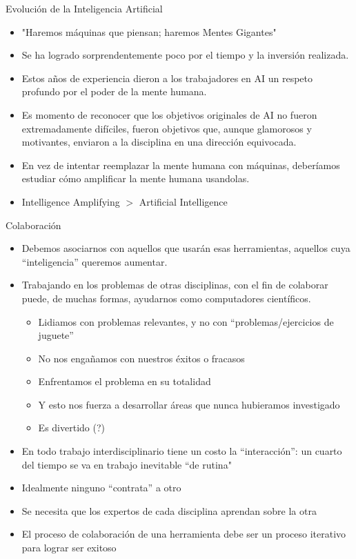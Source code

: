 \documentclass{beamer}
\begin{document}
\begin{frame}{Evolución de la Inteligencia Artificial}
\begin{itemize}
\item "Haremos máquinas que piensan; haremos Mentes Gigantes"
\item Se ha logrado sorprendentemente poco por el tiempo y la inversión realizada.
\item Estos años de experiencia dieron a los trabajadores en AI 
un respeto profundo por el poder de la mente humana.
\item Es momento de reconocer que los objetivos originales de AI 
no fueron extremadamente difíciles,
fueron objetivos que, aunque glamorosos y motivantes, 
enviaron a la disciplina en una dirección equivocada.
\item En vez de intentar reemplazar la mente humana con máquinas, 
deberíamos estudiar cómo amplificar la mente humana usandolas.
\item Intelligence Amplifying $>$ Artificial Intelligence
\end{itemize}
\end{frame}

\begin{frame}{Colaboración}
\begin{itemize}
\item Debemos asociarnos con aquellos que usarán esas herramientas, aquellos cuya ``inteligencia'' queremos aumentar.
\item Trabajando en los problemas de otras disciplinas, con el fin de colaborar puede, de muchas formas, ayudarnos como computadores científicos.
	\begin{itemize}
	\item Lidiamos con problemas relevantes, y no con ``problemas/ejercicios de juguete''
	\item No nos engañamos con nuestros éxitos o fracasos
	\item Enfrentamos el problema en su totalidad
	\item Y esto nos fuerza a desarrollar áreas que nunca hubieramos investigado
	\item Es divertido (?)
	\end{itemize}
\item En todo trabajo interdisciplinario tiene un costo la ``interacción'': un cuarto del tiempo se va en trabajo inevitable ``de rutina"
\item Idealmente ninguno ``contrata'' a otro
\item Se necesita que los expertos de cada disciplina aprendan sobre la otra
\item El proceso de colaboración de una herramienta debe ser un proceso iterativo para lograr ser exitoso

\end{itemize}
\end{frame}
\end{document}
